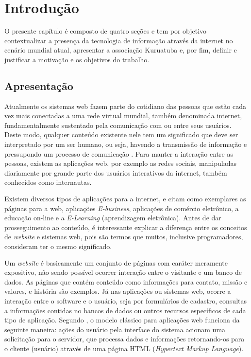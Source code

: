
\chapter{Introdução}
\label{ch:introducao}
\hspace{2.5cm}

O presente capítulo é composto de quatro seções e tem por objetivo contextualizar a presença da tecnologia de informação através da internet no cenário mundial atual, apresentar a associação Kuruatuba e, por fim, definir e justificar a motivação e os objetivos do trabalho.

\hspace{2.5cm}
\section{Apresentação}
\label{sec:apresentacao}
\hspace{2.5cm}


Atualmente os sistemas web fazem parte do cotidiano das pessoas que estão cada vez mais conectadas a uma rede virtual mundial, também denominada internet, fundamentalmente sustentado pela comunicação com ou entre seus usuários.
Deste modo, qualquer conteúdo existente nele tem um significado que deve ser interpretado por um ser humano, ou seja, havendo a transmissão de informação e pressupondo um processo de comunicação \cite{de2012rede}. Para manter a interação entre as pessoas, existem as aplicações web, por exemplo as redes sociais, manipuladas diariamente por grande parte dos usuários interativos da internet, também conhecidos como internautas. 

Existem diversos tipos de aplicações para a internet,  e  citam como exemplares as páginas para a web, aplicações \textit{E-business}, aplicações de comércio eletrônico, a educação on-line e a \textit{E-Learning} (aprendizagem eletrônica). Antes de dar prosseguimento ao conteúdo, é interessante explicar a diferença entre os conceitos de \textit{website} e sistemas web, pois são termos que muitos, inclusive programadores, consideram ter o mesmo significado. 

Um \textit{website} é basicamente um conjunto de páginas com caráter meramente expositivo, não sendo possível ocorrer interação entre o visitante e um banco de dados. As páginas que contém conteúdo como informações para contato, missão e valores, e história são exemplos. Já nas aplicações ou sistemas web, ocorre a interação entre o software e o usuário, seja por formulários de cadastro, consultas a informações contidas no bancos de dados ou outros recursos específicos de cada tipo de aplicação. Segundo , o modelo clássico para aplicações web funciona da seguinte maneira: ações do usuário pela interface do sistema acionam uma solicitação para o servidor, que processa dados e informações retornando-os para o cliente (usuário) através de uma página HTML
(\textit{Hypertext Markup Language}).

